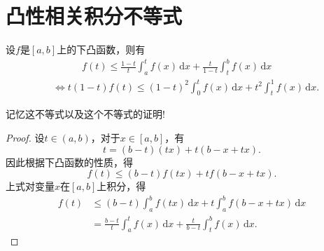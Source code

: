 \documentclass[../../main.tex]{subfiles}
\begin{document}
\section{凸性相关积分不等式}

\begin{proposition}\label{proposition:凸性积分不等式}
设\( f \)是\([a,b]\)上的下凸函数，则有
\begin{align*}
&\qquad \quad  f(t) \leqslant \frac{1-t}{t} \int_a^t f(x)\,\text{d}x + \frac{t}{1-t}\int_t^b f(x)\,\text{d}x
\\
&\iff t(1 - t)f(t) \leqslant (1 - t)^2 \int_{0}^{t} f(x) \, \mathrm{d}x + t^2 \int_{t}^{1} f(x) \, \mathrm{d}x.
\end{align*}
\end{proposition}
\begin{note}
记忆这不等式以及这个不等式的证明!
\end{note}
\begin{proof}
设\( t \in (a,b) \)，对于\( x \in [a,b] \)，有
\[
t = (b-t)(tx) + t(b - x + tx).
\]
因此根据下凸函数的性质，得
\[
f(t) \leqslant (b-t)f(tx) + tf(b - x + tx).
\]
上式对变量\( x \)在\([a,b]\)上积分，得
\begin{align*}
f(t) &\leqslant (b-t)\int_a^b f(tx)\,\text{d}x + t\int_a^b f(b - x + tx)\,\text{d}x \\
&= \frac{b-t}{t} \int_a^t f(x)\,\text{d}x + \frac{t}{b-t}\int_t^b f(x)\,\text{d}x.
\end{align*}

\end{proof}
\end{document}
